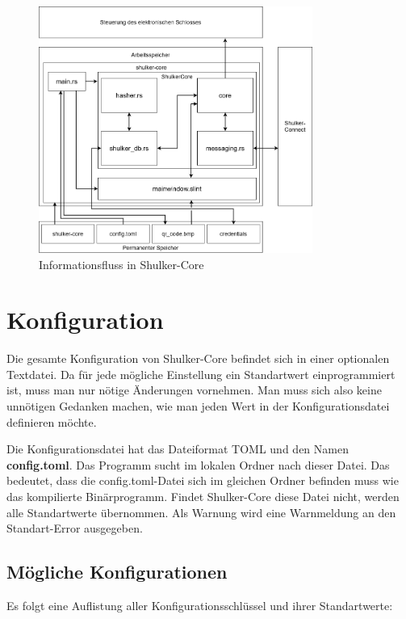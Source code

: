 \begin{figure}[H]
    \begin{center}
        \hspace*{2cm}
        \includegraphics[width=0.8\textwidth]{images/core/informationsfluss.png}
        \caption{Informationsfluss in Shulker-Core}
    \end{center}
\end{figure}


\section{Konfiguration}
Die gesamte Konfiguration von Shulker-Core befindet sich in einer optionalen Textdatei. Da für jede mögliche Einstellung ein
Standartwert einprogrammiert ist, muss man nur nötige Änderungen vornehmen. Man muss sich also keine unnötigen Gedanken machen,
wie man jeden Wert in der Konfigurationsdatei definieren möchte.

Die Konfigurationsdatei hat das Dateiformat TOML und den Namen \textbf{config.toml}. Das Programm sucht im lokalen Ordner
nach dieser Datei. Das bedeutet, dass die config.toml-Datei sich im gleichen Ordner befinden muss wie das kompilierte Binärprogramm. Findet
Shulker-Core diese Datei nicht, werden alle Standartwerte übernommen. Als Warnung wird eine 
Warnmeldung an den Standart-Error ausgegeben.

\subsection{Mögliche Konfigurationen}
Es folgt eine Auflistung aller Konfigurationsschlüssel und ihrer Standartwerte:

